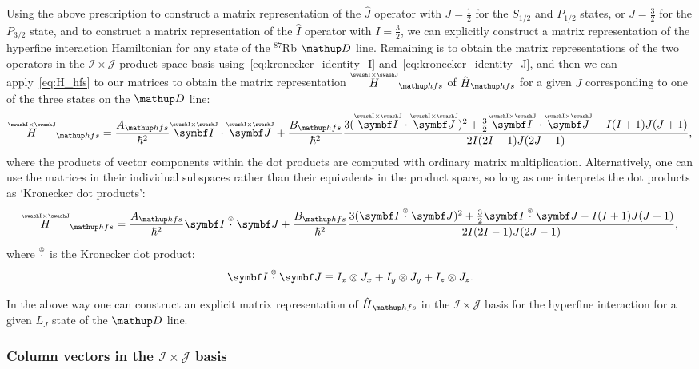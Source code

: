 Using the above prescription to construct a matrix representation of the $\hat J$ operator with $J=\frac12$ for the $S_{1/2}$ and $P_{1/2}$ states, or $J=\frac32$ for the $P_{3/2}$ state, and to construct a matrix representation of the $\hat I$ operator with $I=\frac32$, we can explicitly construct a matrix representation of the hyperfine interaction Hamiltonian for any state of the $^{87}$Rb $\up{D}$ line. Remaining is to obtain the matrix representations of the two operators in the $\mathcal{I}\times\mathcal{J}$ product space basis using~\eqref{eq:kronecker_identity_I} and~\eqref{eq:kronecker_identity_J}, and then we can apply~\eqref{eq:H_hfs} to our matrices to obtain the matrix representation $\oversetIJ H_\up{hfs}$ of $\hat H_\up{hfs}$ for a given $J$ corresponding to one of the three states on the $\up{D}$ line:
\begin{align}\label{eq:H_hfs_matrix}
\oversetIJ H_\up{hfs} = \frac{A_\up{hfs}}{\hbar^2}
\oversetIJ{\vec I} \cdot
\oversetIJ{\vec J}
+ \frac{B_\up{hfs}}{\hbar^2}\frac
{3(\oversetIJ{\vec I}\cdot
\oversetIJ{\vec J})^2
+ \frac32 \oversetIJ{\vec I}\cdot
\oversetIJ{\vec J}
 - I(I + 1)J(J + 1)}
{2I(2I - 1)J(2J - 1)},
\end{align}
where the products of vector components within the dot products are computed with ordinary matrix multiplication. Alternatively, one can use the matrices in their individual subspaces rather than their equivalents in the product space, so long as one interprets the dot products as `Kronecker dot products':
\begin{align}\label{eq:H_hfs_matrix_kron}
\oversetIJ H_\up{hfs} = \frac{A_\up{hfs}}{\hbar^2}
\vec I \krondot \vec J
+ \frac{B_\up{hfs}}{\hbar^2}\frac
{3(\vec I \krondot \vec J)^2
+ \frac32 \vec I \krondot \vec J
 - I(I + 1)J(J + 1)}
{2I(2I - 1)J(2J - 1)},
\end{align}
where $\overset{\scriptscriptstyle\otimes}\cdot$ is the Kronecker dot product:
\begin{align}
\vec I \krondot \vec J \equiv I_x \otimes J_x + I_y \otimes J_y + I_z \otimes J_z.
\end{align}

In the above way one can construct an explicit matrix representation of $\hat H_\up{hfs}$ in the $\mathcal{I} \times \mathcal{J}$ basis for the hyperfine interaction for a given $L_J$ state of the $\up{D}$ line.

\subsubsection{Column vectors in the $\mathcal{I}\times\mathcal{J}$ basis}

